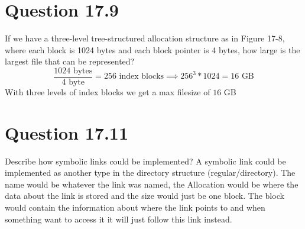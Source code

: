 \documentclass{article}
\begin{document}
\section*{Question 17.9}
If we have a three-level tree-structured allocation structure as in Figure 17-8, where each block is 1024 bytes and each block pointer is 4 bytes, how large is the largest file that can be represented?
\newline
$$ \frac{1024 \text{ bytes}}{4\text{ byte}} = 256 \text{ index blocks} \implies 256^{3} * 1024 = 16\text{ GB}$$
With three levels of index blocks we get a max filesize of $16$ GB

\section*{Question 17.11}
Describe how symbolic links could be implemented?
\newline
A symbolic link could be implemented as another type in the directory structure (regular/directory).
The name would be whatever the link was named, the Allocation would be where the data about the link is stored and the size would just be one block.
The block would contain the information about where the link points to and when something want to access it it will just follow this link instead.
\end{document}
